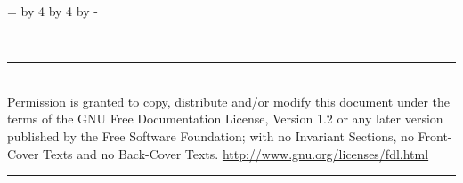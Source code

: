 \documentclass[8pt,pagesize,twoside,footexclude,headexclude]{scrartcl}
\begin{document}
\clearpage
\pagestyle{empty}
\newcount\currentpage 
\currentpage=\value{page} 
\divide\currentpage by 4  
\multiply\currentpage by 4  
\advance\currentpage by -\value{page}
%
\ifnum\the{} 
\rule{0pt}{0pt}\clearpage
\else\ifnum\the{}
\rule{0pt}{0pt}\clearpage\rule{0pt}{0pt}\clearpage 
\else\ifnum\the{}
\rule{0pt}{0pt}\clearpage\rule{0pt}{0pt}\clearpage\rule{0pt}{0pt}\clearpage 
\fi\fi\fi
%
\begin{titlepage}
  \begin{center}
    \renewcommand{\rmdefault}{ptm} %
    \vspace*{20pt}
    \vfill
    \begin{minipage}{\titlepagewidth}
      \begin{center}
        \rmfamily\mdseries\itshape\fontsize{300}{0}\selectfont
        \\
      \end{center}
    \end{minipage}
    \vfill
    \vspace*{43mm}%
    \begin{minipage}{\titlepagewidth}
      \hrule
      \vspace{1.5mm}
      \rmfamily\small
      \\[1.5mm] 
      Permission is granted to copy, distribute and/or modify this
      document under the terms of the GNU Free Documentation License,
      Version 1.2 or any later version published by the Free Software
      Foundation; with no Invariant Sections, no Front-Cover Texts and
      no Back-Cover Texts.\hfill
      \href{http://www.gnu.org/licenses/fdl.html}{http://www.gnu.org/licenses/fdl.html}\\
      \vspace{-1mm}
      \hrule
    \end{minipage}
  \end{center}
\end{titlepage}
\end{document}

